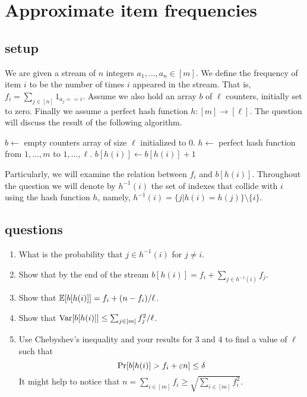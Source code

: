 \documentclass{article}
\begin{document}

\section{Approximate item frequencies}
\subsection*{setup}
We are given a stream of $n$ integers $a_1,\ldots,a_n \in [m]$. We define the frequency of item $i$ to be the number of times $i$ appeared in the stream.
That is, $f_i = \sum_{j \in [n]} 1_{a_j == i}$. Assume we also hold an array $b$ of $\ell$ counters, initially set to zero. 
Finally we assume a perfect hash function $h:[m]\rightarrow[\ell]$. The question will discuss the result of the following algorithm.
\begin{algorithm}[h!]
\begin{algorithmic}
\STATE $b \leftarrow$ empty counters array of size $\ell$ initialized to $0$.
\STATE $h \leftarrow$ perfect hash function from $1,\ldots,m$ to $1,\ldots,\ell$.
\STATE $b[h(i)] \leftarrow b[h(i)] + 1$
\ENDFOR
\end{algorithmic}
\end{algorithm}

\noindent Particularly, we will examine the relation between $f_i$ and $b[h(i)]$.
Throughout the question we will denote by 
$h^{-1}(i)$ the set of indexes that collide with $i$ using the hash function $h$, namely, $h^{-1}(i) = \{j | h(i)=h(j)\} \setminus \{i\} $.
\subsection*{questions}
\begin{enumerate}
\item What is the probability that $j \in h^{-1}(i)$ for $j \ne i$.
\item Show that by the end of the stream $b[h(i)] = f_i + \sum_{j \in h^{-1}(i)} f_j$.
\item Show that ${\mathbb E}[b[h(i)]] = f_i + (n-f_i)/\ell$.
\item Show that ${\operatorname{Var}}[b[h(i)]] \le \sum_{j \in [m]} f^2_j/\ell$.
\item Use Chebyshev's inequality and your results for 3 and 4 to find a value of $\ell$ such that 
\[
\Pr[ b[h(i)] > f_i + \varepsilon n] \le \delta
\]
It might help to notice that $n = \sum_{i \in [m]} f_i \ge \sqrt{\sum_{i \in [m]} f^2_i}$.
\end{enumerate}
\pagebreak
\end{document}
